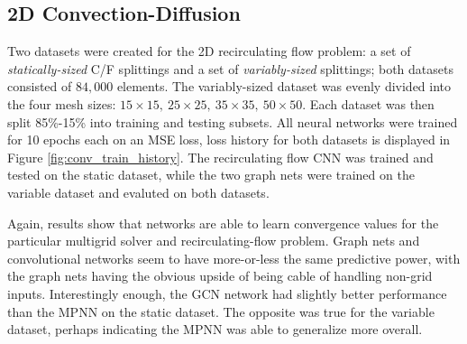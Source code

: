 \documentclass[review]{siamart190516}
\begin{document}
\subsection{2D Convection-Diffusion}

Two datasets were created for the 2D recirculating flow problem: a set of \textit{statically-sized} C/F splittings and a set of \textit{variably-sized} splittings; both datasets consisted of $84,000$ elements.  The variably-sized dataset was evenly divided into the four mesh sizes: $15\times 15,\: 25\times 25,\: 35\times 35,\: 50\times 50$.  Each dataset was then split 85\%-15\% into training and testing subsets.  All neural networks were trained for 10 epochs each on an MSE loss, loss history for both datasets is displayed in Figure \ref{fig:conv_train_history}.  The recirculating flow CNN was trained and tested on the static dataset, while the two graph nets were trained on the variable dataset and evaluted on both datasets.

Again, results show that networks are able to learn convergence values for the particular multigrid solver and recirculating-flow problem.  Graph nets and convolutional networks seem to have more-or-less the same predictive power, with the graph nets having the obvious upside of being cable of handling non-grid inputs.  Interestingly enough, the GCN network had slightly better performance than the MPNN on the static dataset.  The opposite was true for the variable dataset, perhaps indicating the MPNN was able to generalize more overall.

\end{document}
